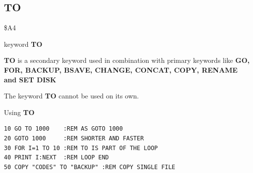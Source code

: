 \subsection{TO}
\begin{description}[leftmargin=2cm,style=nextline]
\item [Token:] \$A4
\item [Format:] keyword {\bf TO}
\item [Usage:]  {\bf TO} is a secondary keyword used in
                combination with primary keywords like
                {\bf GO, FOR, BACKUP, BSAVE, CHANGE, CONCAT, COPY,
                RENAME and SET DISK}

\item [Remarks:] The keyword {\bf TO} cannot be used on its own.

\item [Example:] Using {\bf TO}

\begin{tcolorbox}[colback=black,coltext=white]
\verbatimfont{\codefont}
\begin{verbatim}
10 GO TO 1000    :REM AS GOTO 1000
20 GOTO 1000     :REM SHORTER AND FASTER
30 FOR I=1 TO 10 :REM TO IS PART OF THE LOOP
40 PRINT I:NEXT  :REM LOOP END
50 COPY "CODES" TO "BACKUP" :REM COPY SINGLE FILE
\end{verbatim}
\end{tcolorbox}
\end{description}


\newpage

